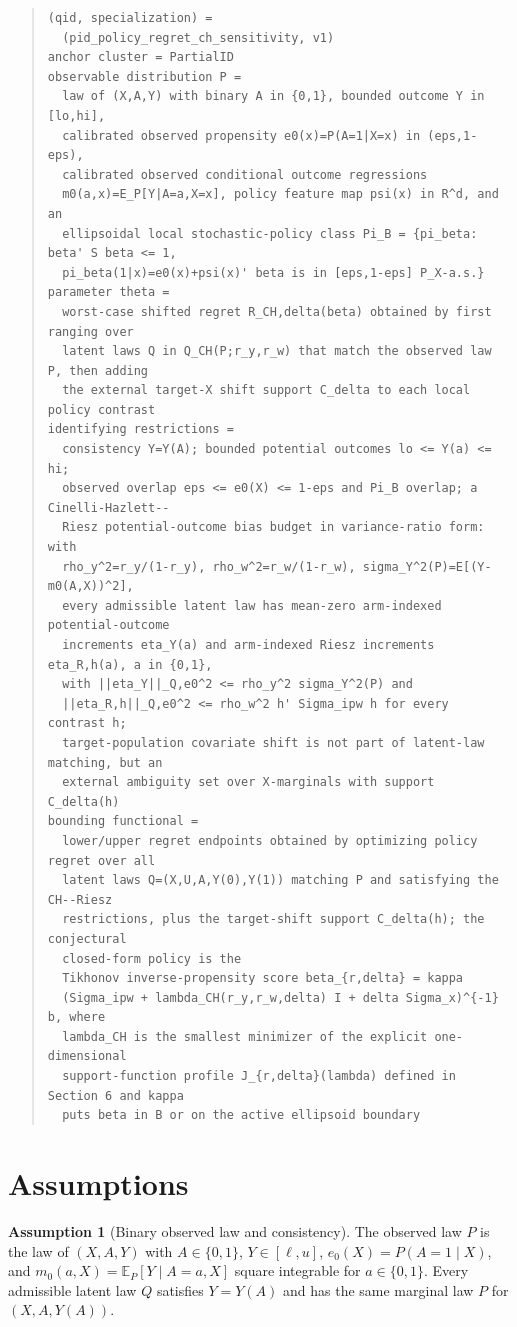 \documentclass[11pt]{article}
\newcommand{\E}{\mathbb{E}}
\theoremstyle{definition}
\newtheorem{assumption}{Assumption}
\theoremstyle{plain}
\theoremstyle{remark}
\begin{document}
\begin{quote}\small
\begin{verbatim}
(qid, specialization) =
  (pid_policy_regret_ch_sensitivity, v1)
anchor cluster = PartialID
observable distribution P =
  law of (X,A,Y) with binary A in {0,1}, bounded outcome Y in [lo,hi],
  calibrated observed propensity e0(x)=P(A=1|X=x) in (eps,1-eps),
  calibrated observed conditional outcome regressions
  m0(a,x)=E_P[Y|A=a,X=x], policy feature map psi(x) in R^d, and an
  ellipsoidal local stochastic-policy class Pi_B = {pi_beta: beta' S beta <= 1,
  pi_beta(1|x)=e0(x)+psi(x)' beta is in [eps,1-eps] P_X-a.s.}
parameter theta =
  worst-case shifted regret R_CH,delta(beta) obtained by first ranging over
  latent laws Q in Q_CH(P;r_y,r_w) that match the observed law P, then adding
  the external target-X shift support C_delta to each local policy contrast
identifying restrictions =
  consistency Y=Y(A); bounded potential outcomes lo <= Y(a) <= hi;
  observed overlap eps <= e0(X) <= 1-eps and Pi_B overlap; a Cinelli-Hazlett--
  Riesz potential-outcome bias budget in variance-ratio form: with
  rho_y^2=r_y/(1-r_y), rho_w^2=r_w/(1-r_w), sigma_Y^2(P)=E[(Y-m0(A,X))^2],
  every admissible latent law has mean-zero arm-indexed potential-outcome
  increments eta_Y(a) and arm-indexed Riesz increments eta_R,h(a), a in {0,1},
  with ||eta_Y||_Q,e0^2 <= rho_y^2 sigma_Y^2(P) and
  ||eta_R,h||_Q,e0^2 <= rho_w^2 h' Sigma_ipw h for every contrast h;
  target-population covariate shift is not part of latent-law matching, but an
  external ambiguity set over X-marginals with support C_delta(h)
bounding functional =
  lower/upper regret endpoints obtained by optimizing policy regret over all
  latent laws Q=(X,U,A,Y(0),Y(1)) matching P and satisfying the CH--Riesz
  restrictions, plus the target-shift support C_delta(h); the conjectural
  closed-form policy is the
  Tikhonov inverse-propensity score beta_{r,delta} = kappa
  (Sigma_ipw + lambda_CH(r_y,r_w,delta) I + delta Sigma_x)^{-1} b, where
  lambda_CH is the smallest minimizer of the explicit one-dimensional
  support-function profile J_{r,delta}(lambda) defined in Section 6 and kappa
  puts beta in B or on the active ellipsoid boundary
\end{verbatim}
\end{quote}

\section{Assumptions}
\begin{assumption}[Binary observed law and consistency]\label{ass:observed-consistency}
The observed law $P$ is the law of $(X,A,Y)$ with $A\in\{0,1\}$, $Y\in[\ell,u]$, $e_0(X)=P(A=1\mid X)$, and $m_0(a,X)=\E_P[Y\mid A=a,X]$ square integrable for $a\in\{0,1\}$. Every admissible latent law $Q$ satisfies $Y=Y(A)$ and has the same marginal law $P$ for $(X,A,Y(A))$.
\end{assumption}
\end{document}
